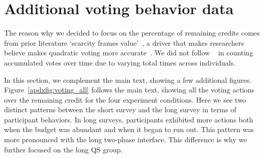

\newpage
\section{Additional voting behavior data}
\label{apdx:additional_results_behavior}
The reason why we decided to focus on the percentage of remaining credits comes from prior literature `scarcity frames value'~\cite{Shah2015a}, a driver that makes researchers believe makes quadratic voting more accurate~\cite{chengCanShowWhat2021}. We did not follow ~\textcite{quarfoot2017quadratic} in counting accumulated votes over time due to varying total times across individuals.

In this section, we complement the main text, showing a few additional figures. Figure~\ref{apdxfig:voting_all} follows the main text, showing all the voting actions over the remaining credit for the four experiment conditions. Here we see two distinct patterns between the short survey and the long survey in terms of participant behaviors. In long surveys, participants exhibited more actions both when the budget was abundant and when it began to run out. This pattern was more pronounced with the long two-phase interface. This difference is why we further focused on the long QS group.

